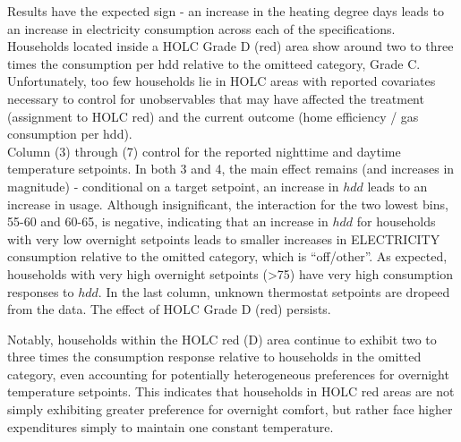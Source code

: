 \documentclass[
]{article}
\begin{document}
Results have the expected sign - an increase in the heating degree days
leads to an increase in electricity consumption across each of the
specifications. Households located inside a HOLC Grade D (red) area show
around two to three times the consumption per hdd relative to the
omitteed category, Grade C. Unfortunately, too few households lie in
HOLC areas with reported covariates necessary to control for
unobservables that may have affected the treatment (assignment to HOLC
red) and the current outcome (home efficiency / gas consumption per
hdd).\\
Column (3) through (7) control for the reported nighttime and daytime
temperature setpoints. In both 3 and 4, the main effect remains (and
increases in magnitude) - conditional on a target setpoint, an increase
in \(hdd\) leads to an increase in usage. Although insignificant, the
interaction for the two lowest bins, 55-60 and 60-65, is negative,
indicating that an increase in \(hdd\) for households with very low
overnight setpoints leads to smaller increases in ELECTRICITY
consumption relative to the omitted category, which is ``off/other''. As
expected, households with very high overnight setpoints (\textgreater75)
have very high consumption responses to \(hdd\). In the last column,
unknown thermostat setpoints are dropeed from the data. The effect of
HOLC Grade D (red) persists.

Notably, households within the HOLC red (D) area continue to exhibit two
to three times the consumption response relative to households in the
omitted category, even accounting for potentially heterogeneous
preferences for overnight temperature setpoints. This indicates that
households in HOLC red areas are not simply exhibiting greater
preference for overnight comfort, but rather face higher expenditures
simply to maintain one constant temperature.
\end{document}
